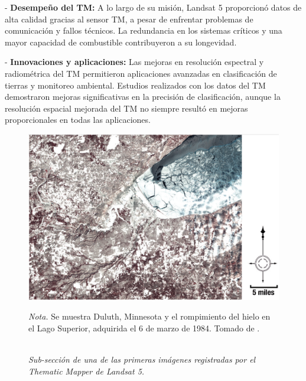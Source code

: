                     - \textbf{Desempeño del TM:} A lo largo de su misión, Landsat 5 proporcionó datos de alta calidad gracias al sensor TM, a pesar de enfrentar problemas de comunicación y fallos técnicos. La redundancia en los sistemas críticos y una mayor capacidad de combustible contribuyeron a su longevidad.

                    - \textbf{Innovaciones y aplicaciones:} Las mejoras en resolución espectral y radiométrica del TM permitieron aplicaciones avanzadas en clasificación de tierras y monitoreo ambiental. Estudios realizados con los datos del TM demostraron mejoras significativas en la precisión de clasificación, aunque la resolución espacial mejorada del TM no siempre resultó en mejoras proporcionales en todas las aplicaciones.

                    \begin{figure}[H] 
                        \caption{\doublespacing \\ \textit{Sub-sección de una de las primeras imágenes registradas por el Thematic Mapper de Landsat 5.}} 
                        \centering
                        \includegraphics[width=1\linewidth]{2_CAPITULO2/IMG/landsat5_tm.png}
                        \begin{justify}
                            \textit{Nota.} Se muestra Duluth, Minnesota y el rompimiento del hielo en el Lago Superior, adquirida el 6 de marzo de 1984​. Tomado de \textcite{landsat_legacy}.
                        \end{justify}                     
                        \label{landsat5_tm}
                    \end{figure}

